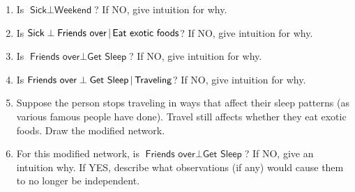 \documentclass[submit]{harvardml}
\newcommand{\attr}[1]{\textsf{#1}}
\begin{document}
\begin{problem}
\begin{enumerate}
\item Is $\attr{Sick} \perp \attr{Weekend}$?
  If NO, give intuition for why.


\item Is $\attr{Sick} \perp \attr{Friends over}\given \attr{Eat exotic
  foods}$? If NO, give intuition for why.


\item Is $\attr{Friends over} \perp \attr{Get Sleep}$? If NO, give
  intuition for why.

\item Is $\attr{Friends over} \perp \attr{Get Sleep} \given
  \attr{Traveling}$? If NO, give intuition for why.

\item Suppose the person stops traveling in ways that affect their
  sleep patterns (as various famous people have done).  Travel still
  affects whether they eat exotic foods.  Draw the modified network.

\item For this modified network, is $\attr{Friends over} \perp
  \attr{Get Sleep}$? If NO, give an intuition why.  If YES,
  describe what observations (if any) would cause them to no longer be
  independent.

\end{enumerate}
\end{problem}

\newpage
\end{document}
